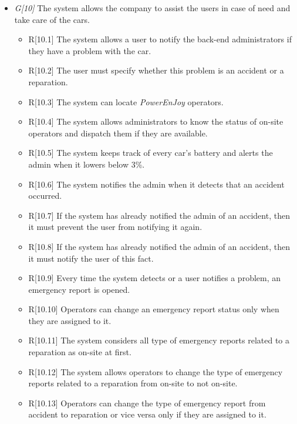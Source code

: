 \begin{itemize}
				\item \textit{G[10]} The system allows the company to assist the users in case of need and take care of the cars.	
					\begin{itemize}
						\item R[10.1] The system allows a user to notify the back-end administrators if they have a problem with the car.
						\item R[10.2] The user must specify whether this problem is an accident or a reparation.
						\item R[10.3] The system can locate \textit{PowerEnJoy} operators. 
						\item R[10.4] The system allows administrators to know the status of on-site operators and dispatch them if they are available.
						\item R[10.5] The system keeps track of every car's battery and alerts the admin when it lowers below 3\%. 
						\item R[10.6] The system notifies the admin when it detects that an accident occurred. 
						\item R[10.7] If the system has already notified the admin of an accident, then it must prevent the user from notifying it again.
						\item R[10.8] If the system has already notified the admin of an accident, then it must notify the user of this fact.
						\item R[10.9] Every time the system detects or a user notifies a problem, an emergency report is opened.
						\item R[10.10] Operators can change an emergency report status only when they are assigned to it.
						\item R[10.11] The system considers all type of emergency reports related to a reparation as on-site at first.
						\item R[10.12] The system allows operators to change the type of emergency reports related to a reparation from on-site to not on-site.
						\item R[10.13] Operators can change the type of emergency report from accident to reparation or vice versa only if they are assigned to it.

					\end{itemize}
					

\end{itemize}
